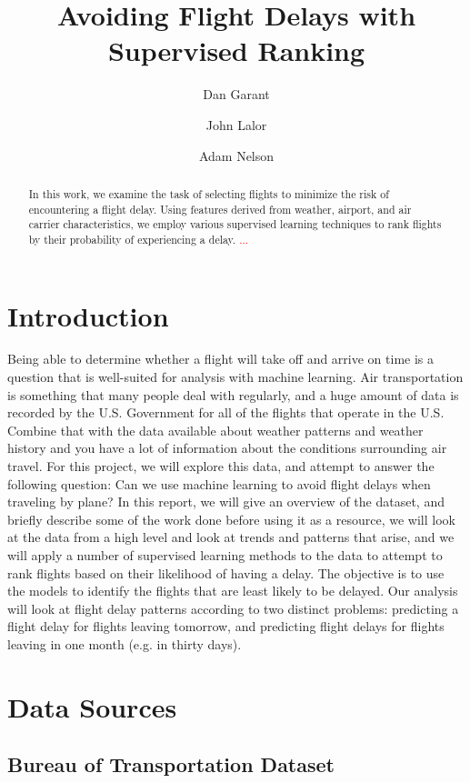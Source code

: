 \documentclass{article}
\title{Avoiding Flight Delays with Supervised Ranking}
\author{Dan Garant \and John Lalor \and Adam Nelson}
\date{}
\begin{document}
\maketitle

\begin{abstract}
In this work, we examine the task of selecting flights to minimize the risk of encountering a flight delay.
Using features derived from weather, airport, and air carrier characteristics, we employ various supervised learning techniques to rank flights by their probability of experiencing a delay.
\textcolor{red}{...}
\end{abstract}

\section{Introduction}

Being able to determine whether a flight will take off and arrive on time is a question that is well-suited for analysis with machine learning. Air transportation is something that many people deal with regularly, and a huge amount of data is recorded by the U.S. Government for all of the flights that operate in the U.S. Combine that with the data available about weather patterns and weather history and you have a lot of information about the conditions surrounding air travel. For this project, we will explore this data, and attempt to answer the following question: Can we use machine learning to avoid flight delays when traveling by plane? In this report, we will give an overview of the dataset, and briefly describe some of the work done before using it as a resource, we will look at the data from a high level and look at trends and patterns that arise, and we will apply a number of supervised learning methods to the data to attempt to rank flights based on their likelihood of having a delay. The objective is to use the models to identify the flights that are least likely to be delayed. Our analysis will look at flight delay patterns according to two distinct problems: predicting a flight delay for flights leaving tomorrow, and predicting flight delays for flights leaving in one month (e.g. in thirty days).

\section{Data Sources}
\subsection{Bureau of Transportation Dataset}
\end{document}
